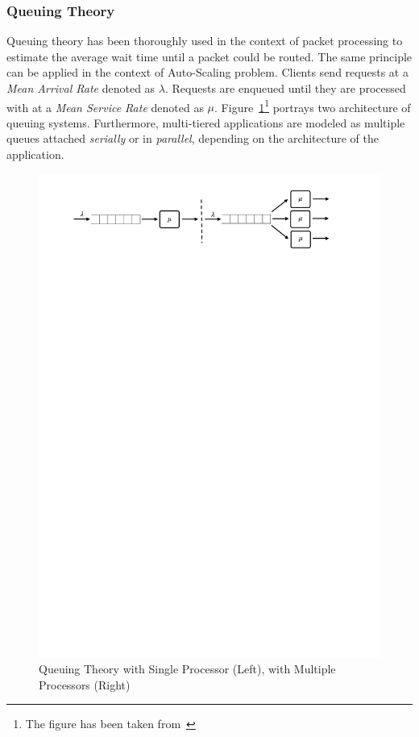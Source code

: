 \subsubsection{Queuing Theory}

Queuing theory has been thoroughly used in the context of packet processing to estimate the average wait time until a packet could be routed. The same principle can be applied in the context of Auto-Scaling problem. Clients send requests at a \emph{Mean Arrival Rate} denoted as $\lambda$. Requests are enqueued until they are processed with at a \emph{Mean Service Rate} denoted as $\mu$. Figure~\ref{fig:queue}\footnote{The figure has been taken from~\cite{Lorido-Botran2014}} portrays two architecture of queuing systems. Furthermore, multi-tiered applications are modeled as multiple queues attached \emph{serially} or in \emph{parallel}, depending on the architecture of the application.
\begin{figure}[h]
    \centering
    \includegraphics[clip, trim=2cm 25cm 3cm 1cm]{queue.pdf}
    \caption{Queuing Theory with Single Processor (Left), with Multiple Processors (Right)}
    \label{fig:queue}
\end{figure}

